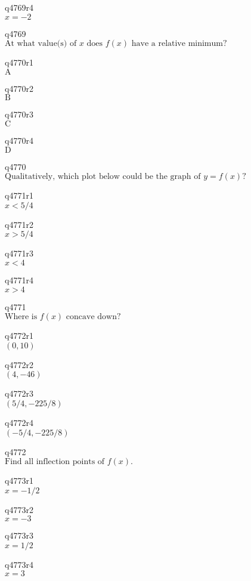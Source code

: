 q4769r4\\
\(\displaystyle x = -2 \)

q4769\\
\(\displaystyle \text{At what value(s) of } x \text{ does } f(x) \text{ have a relative minimum?} \)

q4770r1\\
\(\displaystyle \text{A} \)

q4770r2\\
\(\displaystyle \text{B} \)

q4770r3\\
\(\displaystyle \text{C} \)

q4770r4\\
\(\displaystyle \text{D} \)

q4770\\
\(\displaystyle \text{Qualitatively, which plot below could be the graph of } y = f(x)? \)

q4771r1\\
\(\displaystyle x < 5/4 \)

q4771r2\\
\(\displaystyle x > 5/4 \)

q4771r3\\
\(\displaystyle x < 4 \)

q4771r4\\
\(\displaystyle x > 4 \)

q4771\\
\(\displaystyle \text{Where is } f(x) \text{ concave down}? \)

q4772r1\\
\(\displaystyle (0, 10) \)

q4772r2\\
\(\displaystyle (4, -46) \)

q4772r3\\
\(\displaystyle (5/4, -225/8) \)

q4772r4\\
\(\displaystyle (-5/4, -225/8) \)

q4772\\
\(\displaystyle \text{Find all inflection points of } f(x). \)

q4773r1\\
\(\displaystyle x = -1/2 \)

q4773r2\\
\(\displaystyle x = -3 \)

q4773r3\\
\(\displaystyle x = 1/2 \)

q4773r4\\
\(\displaystyle x = 3 \)

